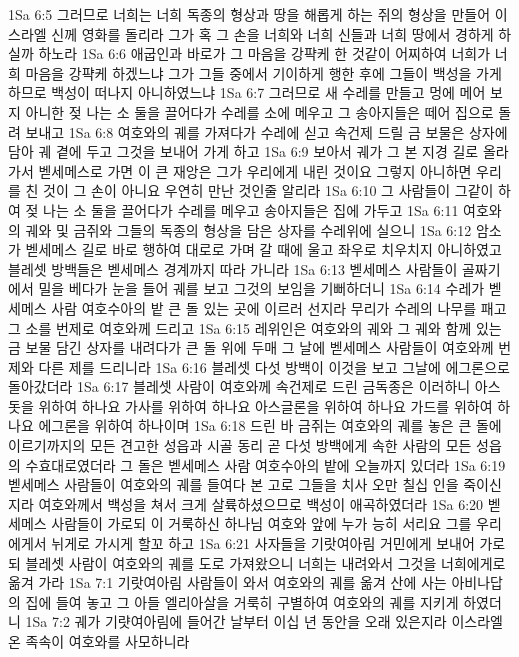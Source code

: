 1Sa 6:5  그러므로 너희는 너희 독종의 형상과 땅을 해롭게 하는 쥐의 형상을 만들어 이스라엘 신께 영화를 돌리라 그가 혹 그 손을 너희와 너희 신들과 너희 땅에서 경하게 하실까 하노라
1Sa 6:6  애굽인과 바로가 그 마음을 강퍅케 한 것같이 어찌하여 너희가 너희 마음을 강퍅케 하겠느냐 그가 그들 중에서 기이하게 행한 후에 그들이 백성을 가게 하므로 백성이 떠나지 아니하였느냐
1Sa 6:7  그러므로 새 수레를 만들고 멍에 메어 보지 아니한 젖 나는 소 둘을 끌어다가 수레를 소에 메우고 그 송아지들은 떼어 집으로 돌려 보내고
1Sa 6:8  여호와의 궤를 가져다가 수레에 싣고 속건제 드릴 금 보물은 상자에 담아 궤 곁에 두고 그것을 보내어 가게 하고
1Sa 6:9  보아서 궤가 그 본 지경 길로 올라가서 벧세메스로 가면 이 큰 재앙은 그가 우리에게 내린 것이요 그렇지 아니하면 우리를 친 것이 그 손이 아니요 우연히 만난 것인줄 알리라
1Sa 6:10  그 사람들이 그같이 하여 젖 나는 소 둘을 끌어다가 수레를 메우고 송아지들은 집에 가두고
1Sa 6:11  여호와의 궤와 및 금쥐와 그들의 독종의 형상을 담은 상자를 수레위에 실으니
1Sa 6:12  암소가 벧세메스 길로 바로 행하여 대로로 가며 갈 때에 울고 좌우로 치우치지 아니하였고 블레셋 방백들은 벧세메스 경계까지 따라 가니라
1Sa 6:13  벧세메스 사람들이 골짜기에서 밀을 베다가 눈을 들어 궤를 보고 그것의 보임을 기뻐하더니
1Sa 6:14  수레가 벧세메스 사람 여호수아의 밭 큰 돌 있는 곳에 이르러 선지라 무리가 수레의 나무를 패고 그 소를 번제로 여호와께 드리고
1Sa 6:15  레위인은 여호와의 궤와 그 궤와 함께 있는 금 보물 담긴 상자를 내려다가 큰 돌 위에 두매 그 날에 벧세메스 사람들이 여호와께 번제와 다른 제를 드리니라
1Sa 6:16  블레셋 다섯 방백이 이것을 보고 그날에 에그론으로 돌아갔더라
1Sa 6:17  블레셋 사람이 여호와께 속건제로 드린 금독종은 이러하니 아스돗을 위하여 하나요 가사를 위하여 하나요 아스글론을 위하여 하나요 가드를 위하여 하나요 에그론을 위하여 하나이며
1Sa 6:18  드린 바 금쥐는 여호와의 궤를 놓은 큰 돌에 이르기까지의 모든 견고한 성읍과 시골 동리 곧 다섯 방백에게 속한 사람의 모든 성읍의 수효대로였더라 그 돌은 벧세메스 사람 여호수아의 밭에 오늘까지 있더라
1Sa 6:19  벧세메스 사람들이 여호와의 궤를 들여다 본 고로 그들을 치사 오만 칠십 인을 죽이신지라 여호와께서 백성을 쳐서 크게 살륙하셨으므로 백성이 애곡하였더라
1Sa 6:20  벧세메스 사람들이 가로되 이 거룩하신 하나님 여호와 앞에 누가 능히 서리요 그를 우리에게서 뉘게로 가시게 할꼬 하고
1Sa 6:21  사자들을 기랏여아림 거민에게 보내어 가로되 블레셋 사람이 여호와의 궤를 도로 가져왔으니 너희는 내려와서 그것을 너희에게로 옮겨 가라
1Sa 7:1  기랏여아림 사람들이 와서 여호와의 궤를 옮겨 산에 사는 아비나답의 집에 들여 놓고 그 아들 엘리아살을 거룩히 구별하여 여호와의 궤를 지키게 하였더니
1Sa 7:2  궤가 기럇여아림에 들어간 날부터 이십 년 동안을 오래 있은지라 이스라엘 온 족속이 여호와를 사모하니라
